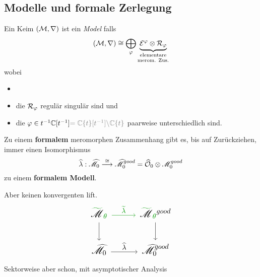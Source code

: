 \subsection{Modelle und formale Zerlegung}%
\begin{defn}
  Ein Keim $(\mathcal{M},\nabla)$ ist ein \emph{Model} falls
  \[
    (\cM,\nabla)
    \cong
    \bigoplus_\phi
    \underset{\text{merom. Zus.}}{%
      \underset{\text{elementare}}{%
        \underbrace{\cE^\phi\otimes\cR_\phi}
      }
    }
  \]
  wobei
  \begin{itemize}
    \item {}
    \item die $\mathcal{R}_\varphi$ regulär singulär sind und
    \item die $\phi\in t^{-1}\C[t^{-1}]
      \textcolor{gray}{=\C\{t\}[t^{-1}]\backslash\C\{t\}}$
      paarweise unterschiedlich sind.
  \end{itemize}
\end{defn}
\begin{comment}
  \begin{lem}
    Ist $(\sM,\nabla)$ ein Modell, so lässt sich die Zusammenhangs Matrix
    schreiben als
    \[
      A^0=dQ+\Lambda\frac{dt}{t}
    \]
    wobei
    \begin{itemize}
      \item $Q=\diag(q_1,\dots,q_n)$ mit $q_i$ meromorph und
      \item $\Lambda$ diagonal und konstant ist.
    \end{itemize}
  \end{lem}
\end{comment}
\begin{paracol}{2}
  \begin{thm}
    Zu einem \textbf{formalem} meromorphen Zusammenhang gibt es, bis auf
    Zurückziehen, immer einen Isomorphismus
    \[
      \widehat\lambda:\widehat{\mathscr{M}}_0
      \overset{\cong}\longrightarrow
      \widehat{\mathscr{M}}_0^{good}
      =\widehat{\mathcal{O}}_0\otimes\mathscr{M}_0^{good}
    \]
    zu einem \textbf{formalem Modell}.
  \end{thm}
\switchcolumn
  \begin{rem}
    Aber keinen konvergenten lift.
    \[ \Large\begin{tikzcd}
        \textcolor{green!60!black}{\tilde{\textcolor{black}{\sM}}_{\theta}}\dar
        \rar[green!60!black]{\tilde\lambda}&
        \textcolor{green!60!black}{%
          \tilde{\textcolor{black}{\sM}}_{\theta}}^{good} \dar
        \\\hat\sM_0 \rar{\hat\lambda} &
        \hat\sM_0^{good}
    \end{tikzcd} \]
    \textcolor{green!60!black}{Sektorweise aber schon, mit asymptotischer
    Analysis}
  \end{rem}
\end{paracol}

